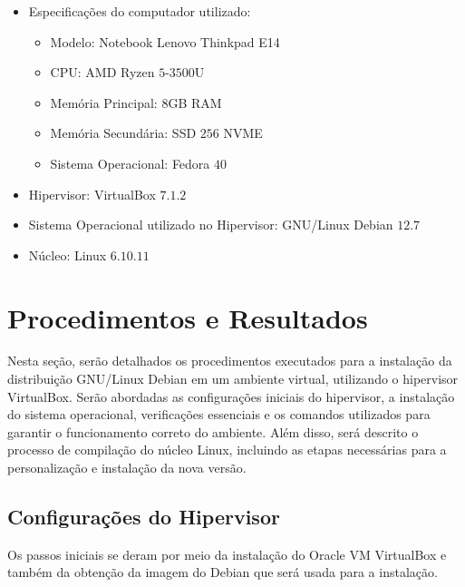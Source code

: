 \documentclass[
	12pt,				%
	oneside,   	        %
	a4paper,			%
	english,			%
	french,				%
	spanish,			%
	brazil,				%
	]{pacotes/abntex2}
\begin{document}
\begin{itemize}
  \item Especificações do computador utilizado:
  \begin{itemize}
    \item Modelo: Notebook Lenovo Thinkpad E14
    \item CPU: AMD Ryzen $5$-$3500$U
    \item Memória Principal: $8$GB RAM
    \item Memória Secundária: SSD $256$ NVME
    \item Sistema Operacional: Fedora $40$
  \end{itemize}
  \item Hipervisor: VirtualBox $7.1.2$
  \item Sistema Operacional utilizado no Hipervisor: GNU/Linux Debian $12.7$
  \item Núcleo: Linux $6.10.11$
\end{itemize}

\section{Procedimentos e Resultados}
\label{sec:procedimentos}

Nesta seção, serão detalhados os procedimentos executados para a instalação da distribuição GNU/Linux Debian em um ambiente virtual, utilizando o hipervisor VirtualBox. Serão abordadas as configurações iniciais do hipervisor, a instalação do sistema operacional, verificações essenciais e os comandos utilizados para garantir o funcionamento correto do ambiente. Além disso, será descrito o processo de compilação do núcleo Linux, incluindo as etapas necessárias para a personalização e instalação da nova versão. 

\subsection{Configurações do Hipervisor}
\label{subsec:hipervisor}

Os passos iniciais se deram por meio da instalação do Oracle VM VirtualBox e também da obtenção da imagem do Debian que será usada para a instalação. 
\end{document}
